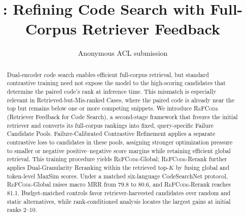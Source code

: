 \documentclass[11pt]{article}
\title{\method{}: Refining Code Search with Full-Corpus Retriever Feedback}
\author{Anonymous ACL submission}
\newcommand{\method}{\textsc{ReFCode}}
\begin{document}
\maketitle

\begin{abstract}
Dual-encoder code search enables efficient full-corpus retrieval, but standard contrastive training need not expose the model to the high-scoring candidates that determine the paired code's rank at inference time. This mismatch is especially relevant in Retrieved-but-Mis-ranked Cases, where the paired code is already near the top but remains below one or more competing snippets. We introduce \method{} (Retriever Feedback for Code Search), a second-stage framework that freezes the initial retriever and converts its full-corpus rankings into fixed, query-specific Failure Candidate Pools. Failure-Calibrated Contrastive Refinement applies a separate contrastive loss to candidates in these pools, assigning stronger optimization pressure to smaller or negative positive--negative score margins while retaining efficient global retrieval. This training procedure yields \method{}-Global; \method{}-Rerank further applies Dual-Granularity Reranking within the retrieved top-\(K\) by fusing global and token-level MaxSim scores. Under a matched six-language CodeSearchNet protocol, \method{}-Global raises macro MRR from 79.8 to 80.6, and \method{}-Rerank reaches 81.1. Budget-matched controls favor retriever-harvested candidates over random and static alternatives, while rank-conditioned analysis locates the largest gains at initial ranks 2--10.
\end{abstract}
\end{document}

